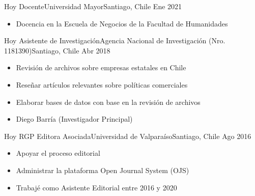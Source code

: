 






\begin{experiences}
  \emptySeparator 
  \experience 
    {Hoy} {Docente}{Universidad Mayor}{Santiago, Chile} {Ene 2021}
    {\begin{itemize}
    \item Docencia en la Escuela de Negocios de la Facultad de Humanidades
    \end{itemize}}
    {}
\end{experiences}
\vspace{-2mm}

\begin{experiences}
  \emptySeparator 
  \experience 
    {Hoy} {Asistente de Investigación}{Agencia Nacional de Investigación (Nro. 1181390)}{Santiago, Chile} {Abr 2018}
    {\begin{itemize}
    \item Revisión de archivos sobre empresas estatales en Chile
    \item Reseñar artículos relevantes sobre políticas comerciales
    \item Elaborar bases de datos con base en la revisión de archivos
    \item Diego Barría {\small (Investigador Principal)}
    \end{itemize}}
    {}
\end{experiences}
\vspace{-2mm}

\begin{experiences}
  \experience
    {Hoy} {RGP Editora Asociada}{Universidad de Valparaíso}{Santiago, Chile} {Ago 2016}
    {\begin{itemize}
    \item Apoyar el proceso editorial
    \item Administrar la plataforma Open Journal System (OJS)
    \item Trabajé como Asistente Editorial entre 2016 y 2020
    \end{itemize}}
    {}
\end{experiences}
\vspace{-2mm}

